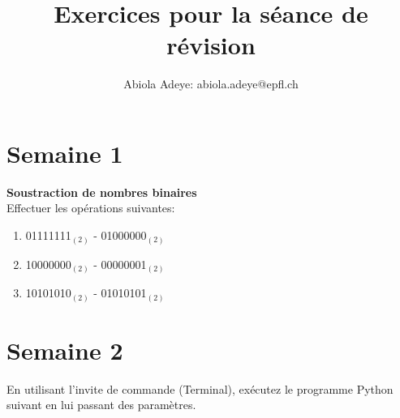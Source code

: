 



\usepackage{amsmath}
\usepackage{graphicx}

\title{Exercices pour la séance de révision}
\author{Abiola Adeye: abiola.adeye@epfl.ch}






\ShowSolutiontrue
\ShowConseiltrue

\maketitle

\section*{Semaine 1}
\begin{Exercice}[15 minutes] \textbf{Soustraction de nombres binaires}\\
    Effectuer les opérations suivantes:
    \begin{enumerate}
        \item 01111111$_{(2)}$ - 01000000$_{(2)}$
        \item 10000000$_{(2)}$ - 00000001$_{(2)}$
        \item 10101010$_{(2)}$ - 01010101$_{(2)}$
    \end{enumerate}
    
\end{Exercice}

\section*{Semaine 2}

\begin{Exercice}[10 minutes]
        En utilisant l'invite de commande (Terminal), exécutez le programme Python suivant en lui passant des paramètres.

        
        

\end{Exercice}

